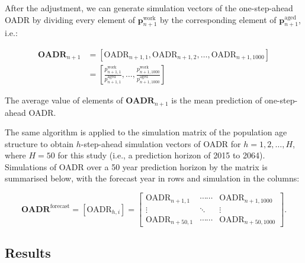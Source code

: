 \documentclass[11pt,a4paper,]{article}
\begin{document}
After the adjustment, we can generate simulation vectors of the
one-step-ahead OADR by dividing every element of
\(\bm{p}^{\text{work}}_{n+1}\) by the corresponding element of
\(\bm{p}^{\text{aged}}_{n+1}\), i.e.: \vspace{-.3in}

\begin{align*}
  \bm{\text{OADR}}_{n+1} & = \left[\text{OADR}_{n+1,1},\text{OADR}_{n+1,2},\dots,\text{OADR}_{n+1,1000}\right]\\
                  & = \left[\frac{p^{\text{work}}_{n+1,1}}{p^{\text{aged}}_{n+1,1}},\dots,\frac{p^{\text{work}}_{n+1,1000}}{p^{\text{aged}}_{n+1,1000}}\right]
\end{align*}

The average value of elements of \(\bm{\text{OADR}}_{n+1}\) is the mean
prediction of one-step-ahead OADR.

The same algorithm is applied to the simulation matrix of the population
age structure to obtain \(h\)-step-ahead simulation vectors of OADR for
\(h=1,2,\dots,H\), where \(H=50\) for this study (i.e., a prediction
horizon of 2015 to 2064). Simulations of OADR over a 50 year prediction
horizon by the matrix is summarised below, with the forecast year in
rows and simulation in the columns:

\begin{equation*}
  \bm{\text{OADR}}^{\text{forecast}}=\left[\text{OADR}_{h,i}\right] =
  \begin{bmatrix}
    \text{OADR}_{n+1,1} & \cdots\cdots & \text{OADR}_{n+1,1000} \\
    \vdots & \ddots & \vdots \\
    \text{OADR}_{n+50,1} & \cdots\cdots & \text{OADR}_{n+50,1000}
  \end{bmatrix}.
\end{equation*}

\subsection{Results}\label{results}
\end{document}
